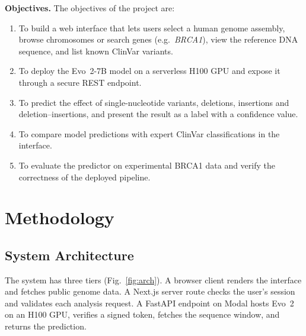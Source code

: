 \documentclass[conference,a4paper]{IEEEtran}
\begin{document}
\textbf{Objectives.} The objectives of the project are:
\begin{enumerate}
\item To build a web interface that lets users select a human genome assembly, browse chromosomes or search genes (e.g.\ \emph{BRCA1}), view the reference DNA sequence, and list known ClinVar variants.
\item To deploy the Evo~2-7B model on a serverless H100 GPU and expose it through a secure REST endpoint.
\item To predict the effect of single-nucleotide variants, deletions, insertions and deletion--insertions, and present the result as a label with a confidence value.
\item To compare model predictions with expert ClinVar classifications in the interface.
\item To evaluate the predictor on experimental BRCA1 data and verify the correctness of the deployed pipeline.
\end{enumerate}

\section{Methodology}
\label{sec:method}

\subsection{System Architecture}
The system has three tiers (Fig.~\ref{fig:arch}). A browser client renders the interface and fetches public genome data. A Next.js server route checks the user's session and validates each analysis request. A FastAPI endpoint on Modal hosts Evo~2 on an H100 GPU, verifies a signed token, fetches the sequence window, and returns the prediction.
\end{document}
